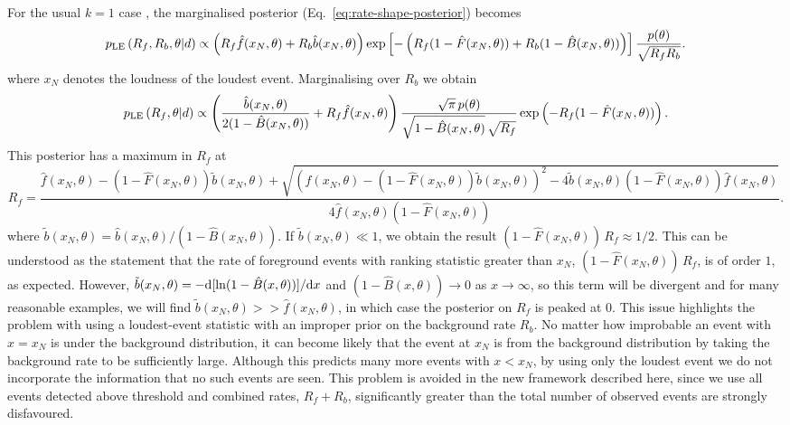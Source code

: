 \documentclass[aps,prd]{revtex4-1}
\begin{document}
For the usual $k=1$ case \citep{Biswas2009}, the marginalised
posterior (Eq.~\eqref{eq:rate-shape-posterior}) becomes
\begin{equation}
p_{\rm LE}\left( R_f, R_b, \theta | d \right) \propto \left(R_f
\hat{f}(x_N,\theta) + R_b \hat{b}(x_N,\theta)\right)\exp\left[-\left(
  R_f (1-\hat{F}(x_N,\theta)) + R_b (1-\hat{B}(x_N,\theta)) \right)
  \right] \frac{p(\theta)}{\sqrt{R_f R_b}}.
\end{equation}
where $x_N$ denotes the loudness of the loudest event. Marginalising
over $R_b$ we obtain
\begin{equation}
p_{\rm LE}\left( R_f, \theta | d \right) \propto \left(
\frac{\hat{b}(x_N,\theta)}{2(1-\hat{B}(x_N,\theta))} + R_f
\hat{f}(x_N,\theta)\right)\frac{\sqrt{\pi}\,
  p(\theta)}{\sqrt{1-\hat{B}(x_N,\theta)}\,\sqrt{R_f}}
\exp\left(-R_f(1-\hat{F}(x_N,\theta))\right) .
\end{equation}
This posterior has a maximum in $R_f$ at
\begin{equation}
R_f =
\frac{\hat{f}(x_N,\theta)-(1-\hat{F}(x_N,\theta))\tilde{b}(x_N,\theta)
  +
  \sqrt{\left(\hat{f}(x_N,\theta)-(1-\hat{F}(x_N,\theta))\tilde{b}(x_N,\theta)\right)^2
    -
    4\tilde{b}(x_N,\theta)(1-\hat{F}(x_N,\theta))\hat{f}(x_N,\theta)}}{4
  \hat{f}(x_N,\theta)(1-\hat{F}(x_N,\theta))}.
\end{equation}
where $\tilde{b}(x_N,\theta)
=\hat{b}(x_N,\theta)/(1-\hat{B}(x_N,\theta))$. If
$\tilde{b}(x_N,\theta) \ll 1$, we obtain the result $(1-
\hat{F}(x_N,\theta))\,R_f \approx 1/2$. This can be understood as
the statement that the rate of foreground events with ranking
statistic greater than $x_N$, $(1- \hat{F}(x_N,\theta))\,R_f$, is of
order $1$, as expected. However, $\tilde{b}(x_N,\theta) = -{\rm d}
[\ln(1-\hat{B}(x,\theta))]/{\rm d}x$ and $(1-\hat{B}(x,\theta))
\rightarrow 0$ as $x \rightarrow \infty$, so this term will be
divergent and for many reasonable examples, we will find
$\tilde{b}(x_N,\theta) >> \hat{f}(x_N,\theta)$, in which case the
posterior on $R_f$ is peaked at $0$. This issue highlights the problem
with using a loudest-event statistic with an improper prior on the
background rate $R_b$. No matter how improbable an event with $x=x_N$
is under the background distribution, it can become likely that the
event at $x_N$ is from the background distribution by taking the
background rate to be sufficiently large. Although this predicts many
more events with $x < x_N$, by using only the loudest event we do not
incorporate the information that no such events are seen. This problem
is avoided in the new framework described here, since we use all
events detected above threshold and combined rates, $R_f+R_b$,
significantly greater than the total number of observed events are
strongly disfavoured.
\end{document}
